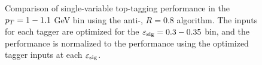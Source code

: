 \begin{figure}
\centering
{}
\caption{Comparison of single-variable top-tagging performance in the $p_T= 1-1.1$ GeV bin using the anti-\kT, $R=0.8$ algorithm. The inputs for each tagger are optimized for the $\varepsilon_{\rm sig}=0.3-0.35$ bin, and the performance is normalized to the performance using the optimized tagger inputs at each $\varepsilon_{\rm sig}$.}
\label{fig:single_variable_ROC_eps0_35}
\end{figure}

